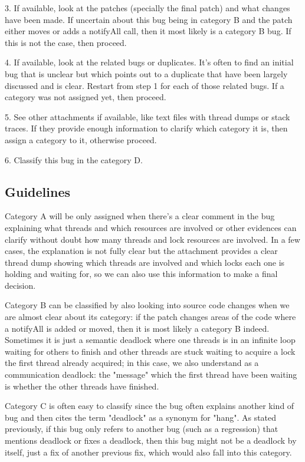 3. If available, look at the patches (specially the final patch) and what changes have been made. If uncertain about this bug being in category B and the patch either moves or adds a notifyAll call, then it most likely is a category B bug. If this is not the case, then proceed.

4. If available, look at the related bugs or duplicates. It's often to find an initial bug that is unclear but which points out to a duplicate that have been largely discussed and is clear. Restart from step 1 for each of those related bugs. If a category was not assigned yet, then proceed.

5. See other attachments if available, like text files with thread dumps or stack traces. If they provide enough information to clarify which category it is, then assign a category to it, otherwise proceed.

6. Classify this bug in the category D.

\subsection{Guidelines}

Category A will be only assigned when there's a clear comment in the bug explaining what threads and which resources are involved or other evidences can clarify without doubt how many threads and lock resources are involved. In a few cases, the explanation is not fully clear but the attachment provides a clear thread dump showing which threads are involved and which locks each one is holding and waiting for, so we can also use this information to make a final decision.

Category B can be classified by also looking into source code changes when we are almost clear about its category: if the patch changes areas of the code where a notifyAll is added or moved, then it is most likely a category B indeed. Sometimes it is just a semantic deadlock where one threads is in an infinite loop waiting for others to finish and other threads are stuck waiting to acquire a lock the first thread already acquired; in this case, we also understand as a communication deadlock: the "message" which the first thread have been waiting is whether the other threads have finished.

Category C is often easy to classify since the bug often explains another kind of bug and then cites the term "deadlock" as a synonym for "hang". As stated previously, if this bug only refers to another bug (such as a regression) that mentions deadlock or fixes a deadlock, then this bug might not be a deadlock by itself, just a fix of another previous fix, which would also fall into this category.

